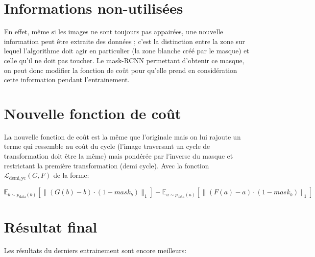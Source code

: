 \section{Informations non-utilisées}
En effet, même si les images ne sont toujours pas appairées, une nouvelle information peut être extraite des données ; c'est la distinction entre la zone sur lequel l'algorithme doit agir en particulier (la zone blanche créé par le masque) et celle qu'il ne doit pas toucher. Le mask-RCNN permettant d'obtenir ce masque, on peut donc modifier la fonction de coût pour qu'elle prend en considération cette information pendant l'entrainement. 

\section{Nouvelle fonction de coût}
La nouvelle fonction de coût est la même que l'originale mais on lui rajoute un terme qui ressemble au coût du cycle (l'image traversant un cycle de transformation doit être la même) mais pondérée par l'inverse du masque et restrictant la première transformation (demi cycle). Avec la fonction $\mathcal{L}_{\mathrm{demi_cyc}}(G, F)$ de la forme:

$$\mathbb{E}_{b \sim p_{\text {data}}(b)}\left[\|(G(b)-b)\cdot (1 - mask_b)\|_{1}\right]+ \mathbb{E}_{a \sim p_{\text {data}}(a)}\left[\|(F(a)-a)\cdot (1 - mask_b)\|_{1}\right]$$

\section{Résultat final}

Les résultats du derniers entrainement sont encore meilleurs:

